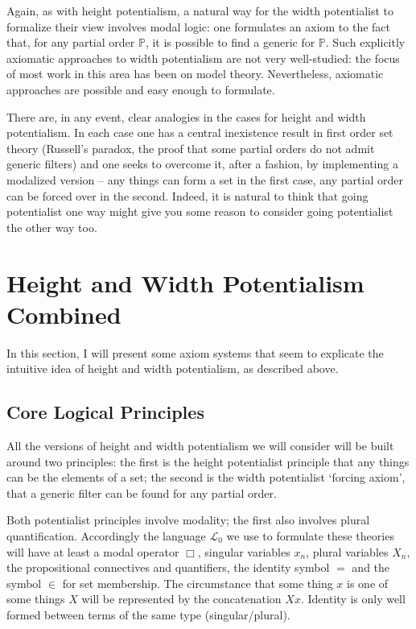 \documentclass{article}
\begin{document}
Again, as with height potentialism, a natural way for the 
width  potentialist to formalize their view 
involves modal logic: one formulates an axiom to the 
fact that, for any partial order $\mathbb{P}$, it is possible to 
find a generic for $\mathbb{P}$. Such explicitly 
axiomatic approaches 
to width  potentialism are not very well-studied: 
the focus of most work in this area has been on model 
theory. Nevertheless, axiomatic approaches are possible 
and easy enough to formulate. 

There are, in any event, clear analogies 
in the cases for height  and width  potentialism. 
In each case one has a central inexistence result 
in first order set theory (Russell's paradox, the 
proof that some partial orders do not admit generic filters) 
and one seeks to overcome it, after a fashion, by 
implementing a modalized version -- any things can 
form a set in the first case, any partial order can 
be forced over in the second. Indeed, it is natural to think 
that going potentialist one way might give you some 
reason to consider going potentialist the other way too. 

\section{Height and Width Potentialism Combined}

In this section, I will present some axiom systems that seem to 
explicate the intuitive idea of height and width potentialism, as 
described above.

\subsection{Core Logical Principles}
All the versions of height and width potentialism we will consider will be built around
two principles: the first is the height potentialist principle that any things can be 
the elements of a set; the second is the width potentialist `forcing axiom', that 
a generic filter can be found for any partial order. 

Both potentialist principles involve modality; the first also involves plural 
quantification. Accordingly the language $\mathcal{L}_0$
we use to formulate these theories 
will have at least a modal operator $\Box$, singular variables $x_n$, plural variables 
$X_n$, the propositional connectives and quantifiers, the identity symbol $=$ 
and the symbol $\in$ for set membership. The circumstance that some thing $x$ is 
one of some things $X$ will be represented by the concatenation $Xx$. Identity 
is only well formed between terms of the same type (singular/plural). 
\end{document}
